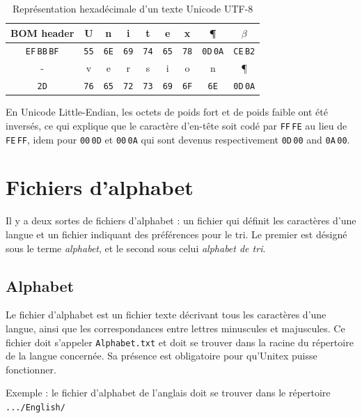 \bigskip
\begin{table}[!h]
\begin{center}
\begin{tabular}{|c|c|c|c|c|c|c|c|c|}
\hline
BOM header & U & n & i & t & e & x & \P & $\beta$
\\
\hline
\verb+EF+\,\verb+BB+\,\verb+BF+ & \verb+55+ & \verb+6E+ & \verb+69+ & \verb+74+ & \verb+65+ & \verb+78+
& \verb+0D+\,\verb+0A+ & \verb+CE+\,\verb+B2+
\\
\hline
\hline
- & v & e & r & s & i & o & n & \P
\\
\hline
\verb+2D+ & \verb+76+ & \verb+65+ & \verb+72+ & \verb+73+ & \verb+69+ & \verb+6F+
& \verb+6E+ & \verb+0D+\,\verb+0A+
\\
\hline
\end{tabular}
\caption{Représentation hexadécimale d’un texte Unicode UTF-8}
\end{center}
\end{table}

\bigskip
\noindent En Unicode Little-Endian, les octets de poids fort et de poids faible ont été inversés, ce qui explique que le caractère d’en-tête soit codé par \verb+FF+\,\verb+FE+ au lieu de \verb+FE+\,\verb+FF+, idem pour \verb+00+\,\verb+0D+ et \verb+00+\,\verb+0A+ qui sont devenus respectivement \verb+0D+\,\verb+00+ and \verb+0A+\,\verb+00+.



\section{Fichiers d’alphabet}
Il y a deux sortes de fichiers d’alphabet : un fichier qui définit les caractères d’une langue
et un fichier indiquant des préférences pour le tri. Le premier est désigné sous le terme
\textit{alphabet}, et le second sous celui \textit{alphabet de tri}.


\subsection{Alphabet}
Le fichier d’alphabet est un fichier texte décrivant tous les caractères d’une langue, ainsi
que les correspondances entre lettres minuscules et majuscules. Ce fichier doit s’appeler
\verb+Alphabet.txt+  et doit se trouver dans la racine du
répertoire  de la langue concernée. Sa présence est obligatoire pour qu’Unitex puisse fonctionner.


\bigskip
\noindent Exemple : le fichier d’alphabet de l’anglais doit se trouver dans le répertoire 
\verb+.../English/+

